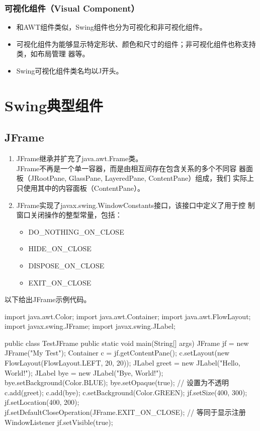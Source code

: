 \subsubsection{可视化组件（Visual Component）}

\begin{itemize}
\item 和AWT组件类似，Swing组件也分为可视化和非可视化组件。
\item 可视化组件为能够显示特定形状、颜色和尺寸的组件；非可视化组件也称支持类，如布局管理
  器等。
\item Swing可视化组件类名均以J开头。
\end{itemize}

\section{Swing典型组件}

\subsection{JFrame}
\begin{enumerate}
\item JFrame继承并扩充了java.awt.Frame类。\\
  {\kai JFrame不再是一个单一容器，而是由相互间存在包含关系的多个不同容
    器面板（JRootPane, GlassPane, LayeredPane, ContentPane）组成，我们
    实际上只使用其中的内容面板（ContentPane）。}
\item JFrame实现了javax.swing.WindowConstants接口，该接口中定义了用于控
  制窗口关闭操作的整型常量，包括：
  \begin{itemize}\small
  \item DO\_NOTHING\_ON\_CLOSE
  \item HIDE\_ON\_CLOSE
  \item DISPOSE\_ON\_CLOSE
  \item EXIT\_ON\_CLOSE
  \end{itemize}
\end{enumerate}

以下给出JFrame示例代码。


\begin{javaCode}
  import java.awt.Color;
  import java.awt.Container;
  import java.awt.FlowLayout;
  import javax.swing.JFrame;
  import javax.swing.JLabel;

  public class TestJFrame {
    public static void main(String[] args){
      JFrame jf = new JFrame("My Test");
      Container c = jf.getContentPane(); 
      c.setLayout(new FlowLayout(FlowLayout.LEFT, 20, 20));
      JLabel greet = new JLabel("Hello, World!");
      JLabel bye = new JLabel("Bye, World!");
      bye.setBackground(Color.BLUE);
      bye.setOpaque(true); // 设置为不透明
      c.add(greet);
      c.add(bye);
      c.setBackground(Color.GREEN);
      jf.setSize(400, 300);
      jf.setLocation(400, 200);
      jf.setDefaultCloseOperation(JFrame.EXIT_ON_CLOSE); // 等同于显示注册 WindowListener
      jf.setVisible(true);
    }
  }
\end{javaCode}

